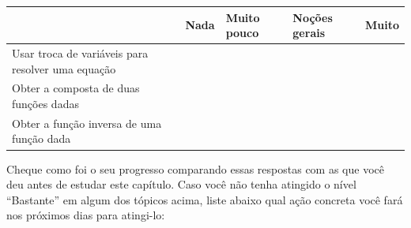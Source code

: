 \documentclass[main.tex]{subfiles}
\begin{document}
\begin{center}
 \begin{tabular}{|p{25mm}||p{10mm}|p{10mm}|p{10mm}|p{10mm}|} 
 \hline
   & Nada & Muito pouco & Noções gerais & Muito\\
 \hline
 Usar troca de variáveis para resolver uma equação &  &  &  &  \\ 
 \hline
 Obter a composta de duas funções dadas &  &  &  &  \\
 \hline
 Obter a função inversa de uma função dada &  &  &  &  \\
 \hline
\end{tabular}
\end{center}

Cheque como foi o seu progresso comparando essas respostas com as que você deu antes de estudar este capítulo. Caso você não tenha atingido o nível ``Bastante''  em algum dos tópicos acima, liste abaixo qual ação concreta você fará nos próximos dias para atingi-lo:

\paraAmbos
\end{document}
